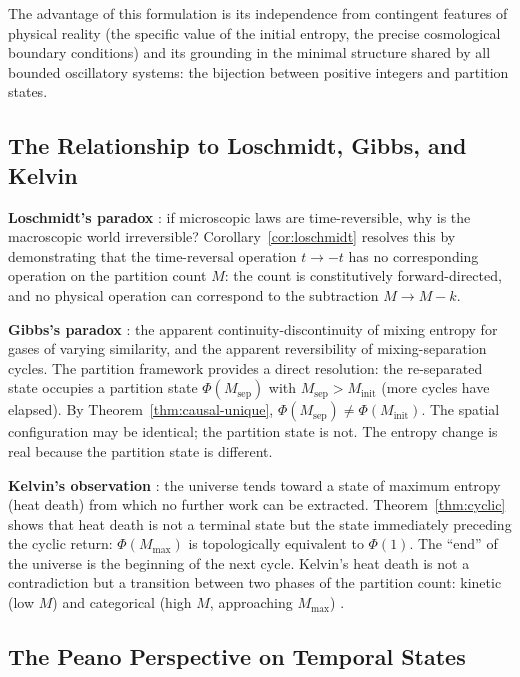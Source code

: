 \documentclass[twocolumn,10pt,a4paper]{article}
\theoremstyle{thmstyle}
\theoremstyle{definition}
\theoremstyle{remark}
\newcommand{\Mmax}{M_{\max}}
\newcommand{\PhiMap}{\varPhi}
\begin{document}
The advantage of this formulation is its independence from contingent features of physical reality (the specific value of the initial entropy, the precise cosmological boundary conditions) and its grounding in the minimal structure shared by all bounded oscillatory systems: the bijection between positive integers and partition states.

\subsection{The Relationship to Loschmidt, Gibbs, and Kelvin}

\textbf{Loschmidt's paradox} \citep{loschmidt1876,loschmidt1877}: if microscopic laws are time-reversible, why is the macroscopic world irreversible? Corollary~\ref{cor:loschmidt} resolves this by demonstrating that the time-reversal operation $t \to -t$ has no corresponding operation on the partition count $M$: the count is constitutively forward-directed, and no physical operation can correspond to the subtraction $M \to M - k$.

\textbf{Gibbs's paradox} \citep{gibbs1902}: the apparent continuity-discontinuity of mixing entropy for gases of varying similarity, and the apparent reversibility of mixing-separation cycles. The partition framework provides a direct resolution: the re-separated state occupies a partition state $\PhiMap(M_{\mathrm{sep}})$ with $M_{\mathrm{sep}} > M_{\mathrm{init}}$ (more cycles have elapsed). By Theorem~\ref{thm:causal-unique}, $\PhiMap(M_{\mathrm{sep}}) \neq \PhiMap(M_{\mathrm{init}})$. The spatial configuration may be identical; the partition state is not. The entropy change is real because the partition state is different.

\textbf{Kelvin's observation} \citep{kelvin1852}: the universe tends toward a state of maximum entropy (heat death) from which no further work can be extracted. Theorem~\ref{thm:cyclic} shows that heat death is not a terminal state but the state immediately preceding the cyclic return: $\PhiMap(\Mmax)$ is topologically equivalent to $\PhiMap(1)$. The ``end'' of the universe is the beginning of the next cycle. Kelvin's heat death is not a contradiction but a transition between two phases of the partition count: kinetic (low $M$) and categorical (high $M$, approaching $\Mmax$) \citep{penrose2010}.

\subsection{The Peano Perspective on Temporal States}
\end{document}
